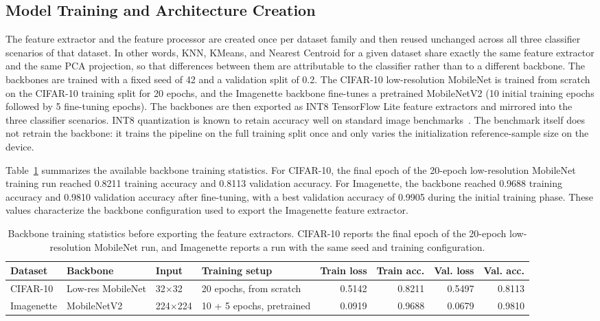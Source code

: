 \documentclass[sigconf,review,nonacm]{acmart}
\begin{document}
\subsection{Model Training and Architecture Creation}
\label{sec:training}
The feature extractor and the feature processor are created once per dataset family and then reused unchanged across all three classifier scenarios of that dataset.
In other words, KNN, KMeans, and Nearest Centroid for a given dataset share exactly the same feature extractor and the same PCA projection, so that differences between them are attributable to the classifier rather than to a different backbone.
The backbones are trained with a fixed seed of 42 and a validation split of 0.2.
The CIFAR-10 low-resolution MobileNet is trained from scratch on the CIFAR-10 training split for 20 epochs, and the Imagenette backbone fine-tunes a pretrained MobileNetV2 (10 initial training epochs followed by 5 fine-tuning epochs).
The backbones are then exported as INT8 TensorFlow Lite feature extractors and mirrored into the three classifier scenarios. INT8 quantization is known to retain accuracy well on standard image benchmarks~\cite{shabir2025compression,ravaglia2021tinyml}.
The benchmark itself does not retrain the backbone: it trains the pipeline on the full training split once and only varies the initialization reference-sample size on the device.

Table~\ref{tab:backbone-training-stats} summarizes the available backbone training statistics.
For CIFAR-10, the final epoch of the 20-epoch low-resolution MobileNet training run reached 0.8211 training accuracy and 0.8113 validation accuracy.
For Imagenette, the backbone reached 0.9688 training accuracy and 0.9810 validation accuracy after fine-tuning, with a best validation accuracy of 0.9905 during the initial training phase.
These values characterize the backbone configuration used to export the Imagenette feature extractor.

\begin{table}[t]
  \caption{Backbone training statistics before exporting the feature extractors. CIFAR-10 reports the final epoch of the 20-epoch low-resolution MobileNet run, and Imagenette reports a run with the same seed and training configuration.}
  \label{tab:backbone-training-stats}
  \centering
  \footnotesize
  \begin{tabular}{@{}llllrrrr@{}}
    \toprule
    Dataset & Backbone & Input & Training setup & Train loss & Train acc. & Val. loss & Val. acc. \\
    \midrule
    CIFAR-10 & Low-res MobileNet & 32$\times$32 & 20 epochs, from scratch & 0.5142 & 0.8211 & 0.5497 & 0.8113 \\
    Imagenette & MobileNetV2 & 224$\times$224 & 10 + 5 epochs, pretrained & 0.0919 & 0.9688 & 0.0679 & 0.9810 \\
    \bottomrule
  \end{tabular}
\end{table}
\end{document}
